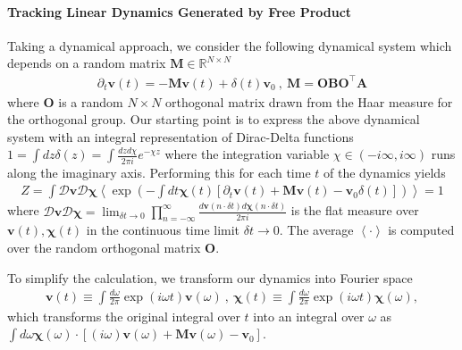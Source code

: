 \documentclass{article} %
\def\v{\bm v}
\begin{document}
\paragraph{Tracking Linear Dynamics Generated by Free Product} Taking a dynamical approach, we consider the following dynamical system which depends on a random matrix  $\bm M \in \mathbb{R}^{N \times N}$ 
\begin{align}
    \partial_{t} \v(t ) = - \bm M \v(t ) + \delta(t ) \v_0 \ , \ \bm M = \bm O \bm B \bm O^\top \bm A 
\end{align}
where $\bm O$ is a random $N \times N$ orthogonal matrix drawn from the Haar measure for the orthogonal group. Our starting point is to express the above dynamical system with an integral representation of Dirac-Delta functions $1 = \int dz \delta(z) = \int  \frac{dz d\chi}{2\pi i } e^{- \chi z}$ where the integration variable $\chi \in (-i\infty, i\infty)$ runs along the imaginary axis. Performing this for each time $t$ of the dynamics yields
\begin{align}
    Z = \int \mathcal D\bm v \mathcal D \bm\chi  \left< \exp\left(  -  \int dt \bm\chi(t) \left[  \partial_t \v(t ) + \bm M \v(t ) - \v_0 \delta(t ) \right] \right) \right> = 1
\end{align}
where $\mathcal D\v \mathcal D\bm\chi = \lim_{\delta t \to 0} \prod_{n=-\infty}^\infty \frac{d\v( n \cdot \delta t) d\bm\chi(n\cdot \delta t)}{2 \pi i }$ is the flat measure over $\v(t),\bm\chi(t)$ in the continuous time limit $\delta t \to 0$. The average $\left< \cdot \right>$ is computed over the random orthogonal matrix $\bm O$. 


To simplify the calculation, we transform our dynamics into Fourier space 
\begin{align}
    \v(t) \equiv \int \frac{d\omega}{2\pi} \exp\left( i \omega t \right) \v(\omega) \ , \ \bm\chi(t) \equiv \int \frac{d\omega}{2\pi}\exp\left( i \omega t \right) \bm\chi(\omega) , 
\end{align}
which transforms the original integral over $t$ into an integral over $\omega$ as $\int d\omega \bm\chi(\omega) \cdot [ (i\omega) \v(\omega) + \bm M \v(\omega) - \v_0 ]$.
\end{document}
